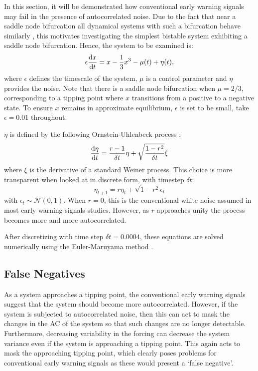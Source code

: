 In this section, it will be demonstrated how conventional early warning signals may fail in the presence of autocorrelated  noise. Due to the fact that near a
saddle node bifurcation all dynamical systems with such a
bifurcation behave similarly \parencite{guckenheimer2013}, this motivates investigating 
the simplest bistable system exhibiting a saddle node
bifurcation. Hence, the system to be examined is: 
\begin{equation}
    \label{eq:dynamical_system}
    \epsilon\dv{x}{t} =  x - \frac{1}{3}x^3 - \mu(t) + \eta(t),
\end{equation}
where $\epsilon$ defines the timescale of the system, $\mu$ is a control parameter and $\eta$ provides the noise. Note that there is a saddle node bifurcation
when $\mu = 2/3$, corresponding to a tipping point where
$x$ transitions from a positive to a negative state. To ensure
$x$ remains in approximate equilibrium, $\epsilon$ is set to be small,
take $\epsilon = 0.01$ throughout.


$\eta$ is defined by the following Ornstein-Uhlenbeck process \parencite{Uhlenbeck1930}:
\begin{equation}
\label{eq:white_red_forcing}
    \dv{\eta}{t} = \frac{r-1}{\delta t}\eta + \sqrt{\frac{1-r^2}{\delta t}} \xi
\end{equation}
where $\xi$ is the derivative of a standard Weiner process. 
This choice is more transparent when looked at in discrete form, with timestep 
$\delta t$:
\begin{equation}
    \label{eq:discretized_white_or_red_noise}
    \eta_{t+1} = r\eta_t + \sqrt{1-r^2} \epsilon_t
\end{equation}
with $\epsilon_t \sim \mathcal{N}(0,1)$. When $r = 0$, this is 
the conventional white noise assumed in most early warning signals
studies. However, as $r$ approaches unity the process becomes
more and more autocorrelated.

After discretizing with time step $\delta t = 0.0004$,
these equations are solved numerically using the 
Euler-Maruyama method \parencite{Jacobs2010}.


\subsection{False Negatives}
As a system approaches a tipping point, the conventional
early warning signals suggest that the system should become more
autocorrelated. However, if the system is subjected to autocorrelated noise,
then this can act to mask the changes in the AC of the system so that such
changes are no longer detectable. Furthermore, decreasing variability in
the forcing can decrease the system variance even if the system is 
approaching a tipping point. This again acts to mask the approaching tipping point, which clearly poses problems for conventional
early warning signals as these would present a `false negative'.

